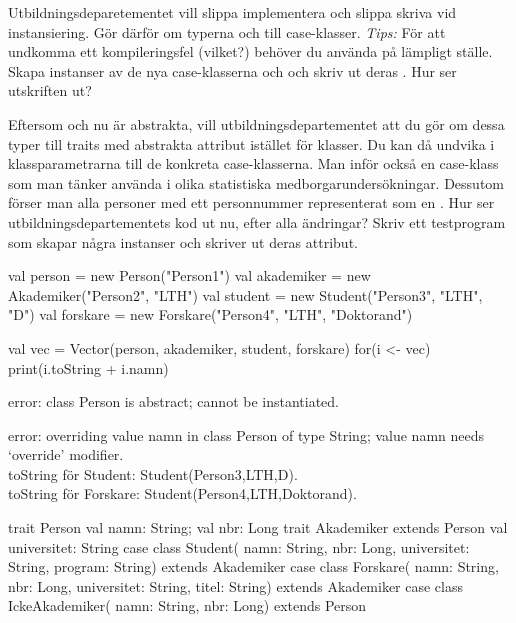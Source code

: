 \Subtask Utbildningsdeparetementet vill slippa implementera  och slippa skriva  vid instansiering. Gör därför om typerna  och  till case-klasser. \emph{Tips:} För att undkomma ett kompileringsfel (vilket?) behöver du använda  på lämpligt ställe.
Skapa instanser av de nya case-klasserna  och  och skriv ut deras . Hur ser utskriften ut?

\Subtask Eftersom  och  nu är abstrakta, vill utbildningsdepartementet att du gör om dessa typer till traits med abstrakta attribut istället för klasser. Du kan då undvika  i klassparametrarna till de konkreta case-klasserna.
Man inför också en case-klass  som man tänker använda i olika statistiska medborgarundersökningar.
Dessutom förser man alla personer med ett personnummer representerat som en .
Hur ser utbildningsdepartementets kod ut nu, efter alla ändringar? Skriv ett testprogram som skapar några instanser och skriver ut deras attribut.

\SOLUTION


\TaskSolved \what


\SubtaskSolved
\begin{Code}
val person = new Person("Person1")
val akademiker = new Akademiker("Person2", "LTH")
val student = new Student("Person3", "LTH", "D")
val forskare = new Forskare("Person4", "LTH", "Doktorand")
\end{Code}

\SubtaskSolved
\begin{Code}
val vec = Vector(person, akademiker, student, forskare)
for(i <- vec){ print(i.toString + i.namn) }
\end{Code}

\SubtaskSolved  error: class Person is abstract; cannot be instantiated.

\SubtaskSolved  error: overriding value namn in class Person of type String; value namn needs `override' modifier.\\
toString för Student: Student(Person3,LTH,D). \\
toString för Forskare: Student(Person4,LTH,Doktorand).

\SubtaskSolved
\begin{Code}
trait Person {val namn: String; val nbr: Long}
trait Akademiker extends Person {val universitet: String}
case class Student(
  namn: String,
  nbr: Long,
  universitet: String,
  program: String) extends Akademiker
case class Forskare(
  namn: String,
  nbr: Long,
  universitet: String,
  titel: String) extends Akademiker
case class IckeAkademiker(
    namn: String,
    nbr: Long) extends Person
\end{Code}



